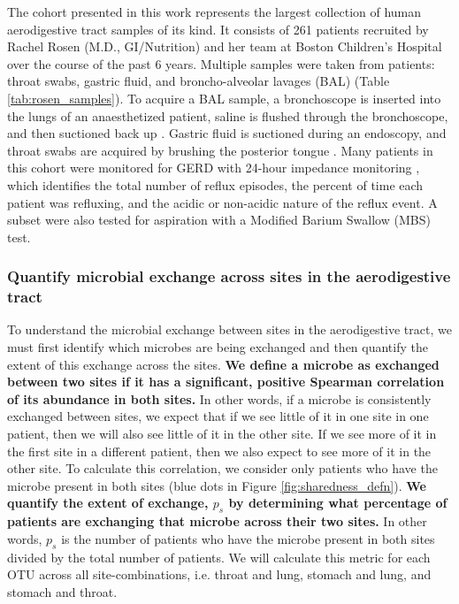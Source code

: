 \documentclass[12pt]{article}
\begin{document}
The cohort presented in this work represents the largest collection of 
human aerodigestive tract samples of its kind.
It consists of 261 patients recruited by Rachel Rosen 
(M.D., GI/Nutrition) and her team at Boston Children's Hospital  
over the course of the past 6 years. Multiple samples were 
taken from patients: throat swabs, gastric fluid, and broncho-alveolar lavages (BAL) (Table \ref{tab:rosen_samples}). 
To acquire a BAL sample, a bronchoscope is inserted into the lungs 
of an anaesthetized patient, saline is flushed through the 
bronchoscope, and then suctioned back up \cite{charslon-topographical-2011}. 
Gastric fluid is suctioned during an endoscopy, and throat
swabs are acquired by brushing the posterior tongue \cite{rosen-ppi-2015}. 
Many patients in this cohort were monitored for GERD with 24-hour
impedance monitoring \cite{vakil-gerd_defn-2006}, which identifies the total number of reflux episodes,
the percent of time each patient was refluxing, and the acidic or non-acidic
nature of the reflux event. A subset were also tested for aspiration with
a Modified Barium Swallow (MBS) test.

\subsubsection{Quantify microbial exchange across sites in the aerodigestive tract} \label{sec:exchange}

To understand the microbial exchange between sites in the 
aerodigestive tract, we must first identify which microbes are being exchanged
and then quantify the extent of this exchange across the sites. 
\textbf{We define a microbe as exchanged between two sites if it has a significant, positive Spearman 
correlation of its abundance in both sites.}
In other words, if a microbe is consistently exchanged between sites, 
we expect that if we see little of it in one site in one patient, then we will also see little of it in the other site. 
If we see more of it in the first site in a different patient,
then we also expect to see more of it in the other site.
To calculate this correlation, we consider only patients who have the microbe present in both sites (blue dots in Figure \ref{fig:sharedness_defn}).
\textbf{We quantify the extent of exchange, $p_s$ by determining what percentage of
patients are exchanging that microbe across their two sites.}
In other words, $p_s$  is the number of patients who have the microbe present in both 
sites divided by the total number of patients.
We will calculate this metric for each OTU across all site-combinations, 
i.e. throat and lung, stomach and lung, and stomach and throat.
\end{document}
